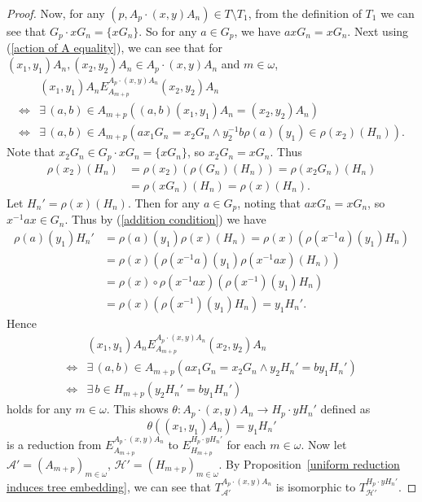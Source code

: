 \documentclass[11pt]{amsart}
\theoremstyle{definition}
\theoremstyle{remark}
\numberwithin{equation}{section}
\def\otr#1#2{T_{\mathcal{#1}}^{#2}}
\begin{document}
\begin{proof}
    Now, for any $(p,A_p\cdot(x,y)A_n)\in T\setminus T_1$, from the definition of $T_1$ we can see that $G_{p}\cdot xG_n=\{xG_n\}.$
    So for any $a\in G_{p}$, we have $axG_n=xG_n$. Next using (\ref{action of A equality}), we can see that for $(x_1,y_1)A_n,(x_2,y_2)A_n\in A_{p}\cdot(x,y)A_n$ and $m\in\omega$,%
    \begin{align*}
        &(x_1,y_1)A_nE_{A_{m+p}}^{A_{p}\cdot(x,y)A_n}(x_2,y_2)A_n\\
        \iff&\exists\,(a,b)\in A_{m+p}\left((a,b)(x_1,y_1)A_n=(x_2,y_2)A_n\right)\\
        \iff&\exists\,(a,b)\in A_{m+p}\left(ax_1G_n=x_2G_n\land y_2^{-1}b\rho(a)(y_1)\in\rho(x_2)(H_n)\right).
    \end{align*}
    Note that $x_2G_n\in G_{p}\cdot xG_n=\{xG_n\}$, so $x_2G_n=xG_n$. Thus
    \begin{align*}
        \rho(x_2)(H_n)&=\rho(x_2)(\rho(G_n)(H_n))=\rho(x_2G_n)(H_n)\\
        &=\rho(xG_n)(H_n)=\rho(x)(H_n).
    \end{align*}
    Let $H_n'=\rho(x)(H_n)$. Then for any $a\in G_{p}$, noting that $axG_n=xG_n$, so $x^{-1}ax\in G_n$. Thus by (\ref{addition condition}) we have
    \begin{align*}
        \rho(a)(y_1)H_n'&=\rho(a)(y_1)\rho(x)(H_n)=\rho(x)\left(\rho(x^{-1}a)(y_1)H_n\right)\\
        &=\rho(x)\left(\rho(x^{-1}a)(y_1)\rho(x^{-1}ax)(H_n)\right)\\
        &=\rho(x)\circ\rho(x^{-1}ax)\left(\rho(x^{-1})(y_1)H_n\right)\\
        &=\rho(x)\left(\rho(x^{-1})(y_1)H_n\right)=y_1H_n'.
    \end{align*}
    Hence
    \begin{align*}
        &(x_1,y_1)A_nE_{A_{m+p}}^{A_{p}\cdot(x,y)A_n}(x_2,y_2)A_n\\
        \iff&\exists\,(a,b)\in A_{m+p}\left(ax_1G_n=x_2G_n\land y_2H_n'=by_1H_n'\right)\\
        \iff&\exists\,b\in H_{m+p}\left(y_2H_n'=by_1H_n'\right)
    \end{align*}
    holds for any $m\in\omega$. This shows $\theta:A_{p}\cdot(x,y)A_n\to H_{p}\cdot yH_n'$ defined as
    $$\theta((x_1,y_1)A_n)=y_1H_n'$$
    is a reduction from $E_{A_{m+p}}^{A_{p}\cdot(x,y)A_n}$ to $E_{H_{m+p}}^{H_{p}\cdot yH_n'}$ for each $m\in\omega$.
    Now let $\mathcal{A}'=(A_{m+p})_{m\in\omega}$, $\mathcal{H}'=(H_{m+p})_{m\in\omega}$.
    By Proposition~\ref{uniform reduction induces tree embedding}, we can see that $\otr{A'}{A_{p}\cdot(x,y)A_n}$ is isomorphic to $T_{\mathcal{H'}}^{H_{p}\cdot yH_n'}$.

\end{proof}
\end{document}
